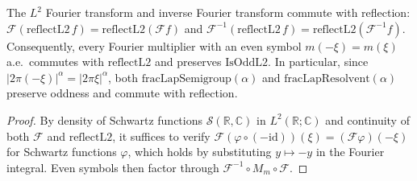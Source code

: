 \begin{theorem}\label{thm:fourier_reflect_and_even_multipliers}
\leanok
The $L^2$ Fourier transform and inverse Fourier transform commute with reflection: $\mathcal{F}(\mathrm{reflectL2}\, f) = \mathrm{reflectL2}(\mathcal{F} f)$ and $\mathcal{F}^{-1}(\mathrm{reflectL2}\, f) = \mathrm{reflectL2}(\mathcal{F}^{-1} f)$. Consequently, every Fourier multiplier with an even symbol $m(-\xi) = m(\xi)$ a.e.\ commutes with $\mathrm{reflectL2}$ and preserves $\mathrm{IsOddL2}$. In particular, since $\lvert 2\pi(-\xi) \rvert^\alpha = \lvert 2\pi\xi \rvert^\alpha$, both $\mathrm{fracLapSemigroup}(\alpha)$ and $\mathrm{fracLapResolvent}(\alpha)$ preserve oddness and commute with reflection.
\end{theorem}

\begin{proof}
\leanok
By density of Schwartz functions $\mathcal{S}(\mathbb{R}, \mathbb{C})$ in $L^2(\mathbb{R}; \mathbb{C})$ and continuity of both $\mathcal{F}$ and $\mathrm{reflectL2}$, it suffices to verify $\mathcal{F}(\varphi \circ (-\mathrm{id}))(\xi) = (\mathcal{F}\varphi)(-\xi)$ for Schwartz functions $\varphi$, which holds by substituting $y \mapsto -y$ in the Fourier integral. Even symbols then factor through $\mathcal{F}^{-1} \circ M_m \circ \mathcal{F}$.
\end{proof}


